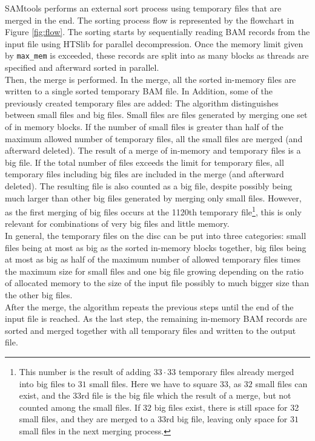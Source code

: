 SAMtools performs an external sort process using temporary files that are merged in the end. The sorting process flow is represented by the flowchart in Figure \ref{fig:flow}. 
The sorting starts by sequentially reading BAM records from the input file using HTSlib for parallel decompression. Once the memory limit given by \texttt{max\_mem} is exceeded, these records are split into as many blocks as threads are specified and afterward sorted in parallel. \\
Then, the merge is performed. In the merge, all the sorted in-memory files are written to a single sorted temporary BAM file. In Addition, some of the previously created temporary files are added: The algorithm distinguishes between small files and big files. Small files are files generated by merging one set of in memory blocks. If the number of small files is greater than half of the maximum allowed number of temporary files, all the small files are merged (and afterward deleted). The result of a merge of in-memory and temporary files is a big file. If the total number of files exceeds the limit for temporary files, all temporary files including big files are included in the merge (and afterward deleted). The resulting file is also counted as a big file, despite possibly being much larger than other big files generated by merging only small files. However, as the first merging of big files occurs at the 1120th temporary file\footnote{This number is the result of adding $33 \cdot 33$ temporary files already merged into big files to $31$ small files. Here we have to square $33$, as $32$ small files can exist, and the $33$rd file is the big file which the result of a merge, but not counted among the small files. If $32$ big files exist, there is still space for 32 small files, and they are merged to a $33$rd big file, leaving only space for $31$ small files in the next merging process.}, this is only relevant for combinations of very big files and little memory. \\
In general, the temporary files on the disc can be put into three categories: small files being at most as big as the sorted in-memory blocks together, big files being at most as big as half of the maximum number of allowed temporary files times the maximum size for small files and one big file growing depending on the ratio of allocated memory to the size of the input file possibly to much bigger size than the other big files. \\
After the merge, the algorithm repeats the previous steps until the end of the input file is reached. As the last step, the remaining in-memory BAM records are sorted and merged together with all temporary files and written to the output file.

